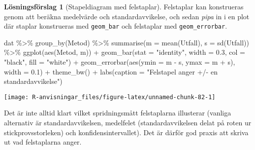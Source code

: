 \documentclass[
]{book}
\newenvironment{Shaded}{\begin{snugshade}}{\end{snugshade}}
\newcommand{\AttributeTok}[1]{\textcolor[rgb]{0.77,0.63,0.00}{#1}}
\newcommand{\FloatTok}[1]{\textcolor[rgb]{0.00,0.00,0.81}{#1}}
\newcommand{\FunctionTok}[1]{\textcolor[rgb]{0.00,0.00,0.00}{#1}}
\newcommand{\NormalTok}[1]{#1}
\newcommand{\SpecialCharTok}[1]{\textcolor[rgb]{0.00,0.00,0.00}{#1}}
\newcommand{\StringTok}[1]{\textcolor[rgb]{0.31,0.60,0.02}{#1}}
\theoremstyle{definition}
\theoremstyle{definition}
\theoremstyle{definition}
\theoremstyle{definition}
\newtheorem{hypothesis}{Lösningsförslag}[chapter]
\theoremstyle{remark}
\begin{document}
\begin{hypothesis}[Stapeldiagram med felstaplar]
Felstaplar kan konstrueras genom att beräkna medelvärde och standardavvikelse, och sedan \emph{pipa} in i en plot där staplar konstrueras med \texttt{geom\_bar} och felstaplar med \texttt{geom\_errorbar}.

\begin{Shaded}
\begin{Highlighting}[]
\NormalTok{dat }\SpecialCharTok{\%\textgreater{}\%} 
  \FunctionTok{group\_by}\NormalTok{(Metod) }\SpecialCharTok{\%\textgreater{}\%} 
  \FunctionTok{summarise}\NormalTok{(}\AttributeTok{m =} \FunctionTok{mean}\NormalTok{(Utfall), }\AttributeTok{s =} \FunctionTok{sd}\NormalTok{(Utfall)) }\SpecialCharTok{\%\textgreater{}\%} 
  \FunctionTok{ggplot}\NormalTok{(}\FunctionTok{aes}\NormalTok{(Metod, m)) }\SpecialCharTok{+}
  \FunctionTok{geom\_bar}\NormalTok{(}\AttributeTok{stat =} \StringTok{"identity"}\NormalTok{, }\AttributeTok{width =} \FloatTok{0.3}\NormalTok{, }\AttributeTok{col =} \StringTok{"black"}\NormalTok{, }\AttributeTok{fill =} \StringTok{"white"}\NormalTok{) }\SpecialCharTok{+}
  \FunctionTok{geom\_errorbar}\NormalTok{(}\FunctionTok{aes}\NormalTok{(}\AttributeTok{ymin =}\NormalTok{ m }\SpecialCharTok{{-}}\NormalTok{ s, }\AttributeTok{ymax =}\NormalTok{ m }\SpecialCharTok{+}\NormalTok{ s), }\AttributeTok{width =} \FloatTok{0.1}\NormalTok{) }\SpecialCharTok{+}
  \FunctionTok{theme\_bw}\NormalTok{() }\SpecialCharTok{+}
  \FunctionTok{labs}\NormalTok{(}\AttributeTok{caption =} \StringTok{"Felstapel anger +/{-} en standardavvikelse"}\NormalTok{)}
\end{Highlighting}
\end{Shaded}

\begin{center}\texttt{[image: R-anvisningar\_files/figure-latex/unnamed-chunk-82-1]} \end{center}

Det är inte alltid klart vilket spridningsmått felstaplarna illusterar (vanliga alternativ är standardavvikelsen, medelfelet (standardavvikelsen delat på roten ur stickprovsstorleken) och konfidensintervallet). Det är därför god praxis att skriva ut vad felstaplarna anger.
\end{hypothesis}
\end{document}
